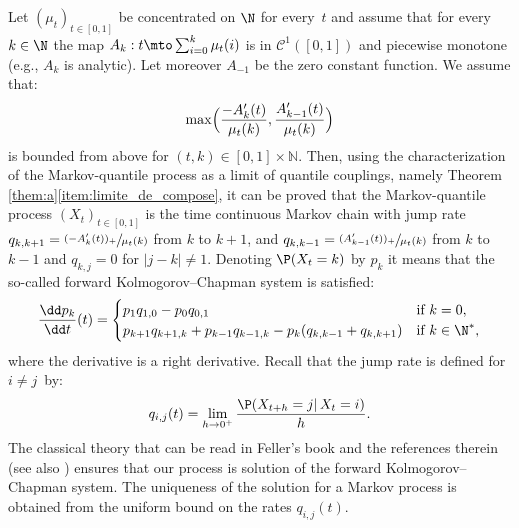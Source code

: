\begin{ex}\label{ex:integers}
Let $(\mu_t)_{t\in [0,1]}$ be concentrated on $\N$ for every~$t$ and assume that for every $k\in \N$ the map $A_k:t\mto \sum_{i=0}^k \mu_t(i)$ is in $\mathcal{C}^1([0,1])$ and piecewise monotone (e.g., $A_k$ is analytic). Let moreover $A_{-1}$ be the zero constant function. We assume that:\vspace*{-3pt}\enlargethispage{.3\baselineskip}%
\[\max\Bigl(\frac{-A'_k(t)}{\mu_t(k)},\frac{A'_{k-1}(t)}{\mu_t(k)}\Bigr)\]
is bounded from above for $(t,k)\in[0,1]\times \mathbb{N}$. Then, using the characterization of the Markov-quantile process as a limit of quantile couplings, namely Theorem \ref{them:a}\eqref{item:limite_de_compose}, it can be proved that the Markov-quantile process $(X_t)_{t\in [0,1]}$ is the time continuous Markov chain with jump rate $q_{k,k+1}=\sfrac{(-A'_k(t))_+}{\mu_t(k)}$ from $k$ to $k+1$, and $q_{k,k-1}=\sfrac{(A'_{k-1}(t))_+}{\mu_t(k)}$ from $k$ to $k-1$ and $q_{k,j}=0$ for $|j-k|\neq 1$. Denoting $\P(X_t=k)$ by $p_k$ it means that the so-called forward Kolmogorov--Chapman system is satisfied:\vspace*{-3pt}
\begin{align*}
\frac{\dd p_k}{\dd t}(t)=
\begin{cases}
p_{1}q_{1,0}-p_0q_{0,1}&\text{if }k=0,\\
p_{k+1}q_{k+1,k}+p_{k-1}q_{k-1,k}-p_k(q_{k,k-1}+q_{k,k+1})&\text{if }k\in \N^*,
\end{cases}
\end{align*}
where the derivative is a right derivative. Recall that the jump rate is defined for $i\neq j$~by:\vspace*{-3pt}
\[
q_{i,j}(t)=\lim_{h\to 0^+}\frac{\P(X_{t+h}=j|\,X_t=i)}{h}.
\]
The classical theory that can be read in Feller's book \cite[Chap.\,XVII, \S 9]{Fe_t1} and the references therein (see also \cite{Doe}) ensures that our process is solution of the forward Kolmogorov--Chapman system. The uniqueness of the solution for a Markov process is obtained from the uniform bound on the rates $q_{i,j}(t)$.


\end{ex}
